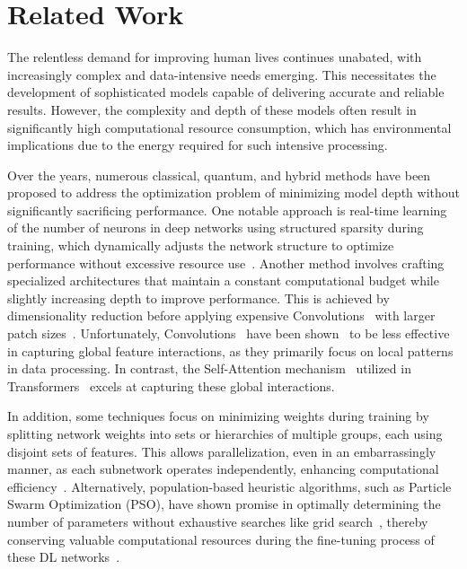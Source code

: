 \documentclass[12pt,a4paper]{report}
\begin{document}
\chapter{Related Work}\vspace{-12pt}
The relentless demand for improving human lives continues unabated, with increasingly complex and data-intensive needs emerging. This necessitates the development of sophisticated models capable of delivering accurate and reliable results. However, the complexity and depth of these models often result in significantly high computational resource consumption, which has environmental implications due to the energy required for such intensive processing.

Over the years, numerous classical, quantum, and hybrid methods have been proposed to address the optimization problem of minimizing model depth without significantly sacrificing performance. One notable approach is real-time learning of the number of neurons in deep networks using structured sparsity during training, which dynamically adjusts the network structure to optimize performance without excessive resource use~\cite{alvarez2018learning}. Another method involves crafting specialized architectures that maintain a constant computational budget while slightly increasing depth to improve performance. This is achieved by dimensionality reduction before applying expensive Convolutions~\cite{wen2021convolutional} with larger patch sizes~\cite{Szegedy_2015_CVPR}. Unfortunately, Convolutions~\cite{wen2021convolutional} have been shown~\cite{cordonnier2020relationship} to be less effective in capturing global feature interactions, as they primarily focus on local patterns in data processing. In contrast, the Self-Attention mechanism~\cite{voita2019analyzing} utilized in Transformers~\cite{vaswani2017attention} excels at capturing these global interactions.

In addition, some techniques focus on minimizing weights during training by splitting network weights into sets or hierarchies of multiple groups, each using disjoint sets of features. This allows parallelization, even in an embarrassingly manner, as each subnetwork operates independently, enhancing computational efficiency~\cite{pmlr-v70-kim17b}. Alternatively, population-based heuristic algorithms, such as Particle Swarm Optimization (PSO), have shown promise in optimally determining the number of parameters without exhaustive searches like grid search~\cite{liashchynskyi2019grid}, thereby conserving valuable computational resources during the fine-tuning process of these DL networks~\cite{7986470}.
\end{document}
